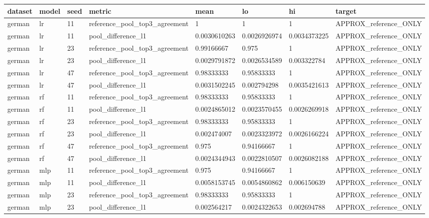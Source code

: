 \begin{tabular}{llllllll}
\toprule
dataset & model & seed & metric & mean & lo & hi & target \\
\midrule
german & lr & 11 & reference\_pool\_top3\_agreement & 1 & 1 & 1 & APPROX\_reference\_ONLY \\
german & lr & 11 & pool\_difference\_l1 & 0.0030610263 & 0.0026926974 & 0.0034373225 & APPROX\_reference\_ONLY \\
german & lr & 23 & reference\_pool\_top3\_agreement & 0.99166667 & 0.975 & 1 & APPROX\_reference\_ONLY \\
german & lr & 23 & pool\_difference\_l1 & 0.0029791872 & 0.0026534589 & 0.003322784 & APPROX\_reference\_ONLY \\
german & lr & 47 & reference\_pool\_top3\_agreement & 0.98333333 & 0.95833333 & 1 & APPROX\_reference\_ONLY \\
german & lr & 47 & pool\_difference\_l1 & 0.0031502245 & 0.002794298 & 0.0035421613 & APPROX\_reference\_ONLY \\
german & rf & 11 & reference\_pool\_top3\_agreement & 0.98333333 & 0.95833333 & 1 & APPROX\_reference\_ONLY \\
german & rf & 11 & pool\_difference\_l1 & 0.0024865012 & 0.0023570455 & 0.0026269918 & APPROX\_reference\_ONLY \\
german & rf & 23 & reference\_pool\_top3\_agreement & 0.98333333 & 0.95833333 & 1 & APPROX\_reference\_ONLY \\
german & rf & 23 & pool\_difference\_l1 & 0.002474007 & 0.0023323972 & 0.0026166224 & APPROX\_reference\_ONLY \\
german & rf & 47 & reference\_pool\_top3\_agreement & 0.975 & 0.94166667 & 1 & APPROX\_reference\_ONLY \\
german & rf & 47 & pool\_difference\_l1 & 0.0024344943 & 0.0022810507 & 0.0026082188 & APPROX\_reference\_ONLY \\
german & mlp & 11 & reference\_pool\_top3\_agreement & 0.975 & 0.94166667 & 1 & APPROX\_reference\_ONLY \\
german & mlp & 11 & pool\_difference\_l1 & 0.0058153745 & 0.0054860862 & 0.006150639 & APPROX\_reference\_ONLY \\
german & mlp & 23 & reference\_pool\_top3\_agreement & 0.98333333 & 0.95833333 & 1 & APPROX\_reference\_ONLY \\
german & mlp & 23 & pool\_difference\_l1 & 0.002564217 & 0.0024322653 & 0.002694788 & APPROX\_reference\_ONLY \\

\end{tabular}

